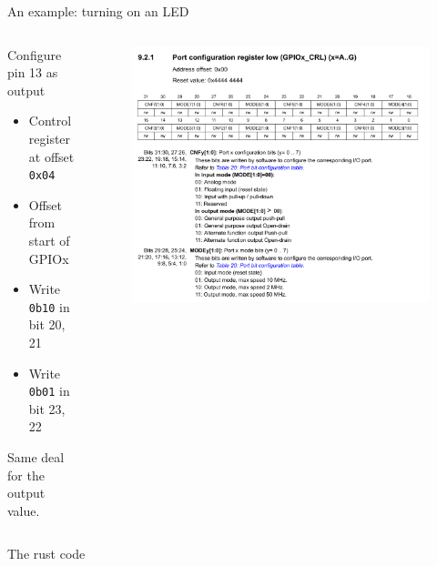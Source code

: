 \documentclass[aspectratio=169]{beamer}
\begin{document}
\begin{frame}{An example: turning on an LED}
    \begin{columns}
        \begin{column}{0.5\textwidth}
            Configure pin 13 as output

            \begin{itemize}
                \item{Control register at offset \texttt{0x04}}
                \item{Offset from start of GPIOx}
                \item{Write \texttt{0b10} in bit 20, 21}
                \item{Write \texttt{0b01} in bit 23, 22}
            \end{itemize}

            Same deal for the output value.
        \end{column}
        \begin{column}{0.5\textwidth}
            \begin{figure}
                \includegraphics[width=\textwidth]{fig/gpio_crl.png}
            \end{figure}
        \end{column}
    \end{columns}
\end{frame}

\begin{frame}{The rust code}
    \begin{linehighlight}{
    }
        
    \end{linehighlight}
\end{frame}
\end{document}
